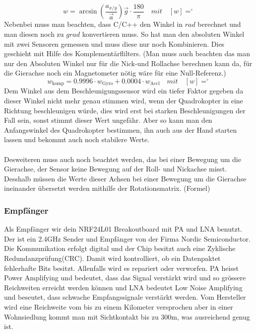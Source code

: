 \documentclass[12pt,a4paper, ngerman]{article}
\begin{document}
\begin{equation}
w=\arcsin(\frac{a_{x/y}}{\vec{a}}
)
\vec{g}\cdot \frac{180}{\pi} \quad mit \quad [w]=^\circ
\end{equation}
Nebenbei muss man beachten, dass C/C++ den Winkel in $rad$ berechnet und man diesen noch zu $grad$ konvertieren muss. So hat man den absoluten Winkel mit zwei Sensoren gemessen und muss diese nur noch Kombinieren. Dies geschieht mit Hilfe des Komplementärflilters. (Man muss auch beachten das man nur den Absoluten Winkel nur für die Nick-und Rollachse berechnen kann da, für die Gierachse noch ein Magnetometer nötig wäre für eine Null-Referenz.)
\begin{equation}
w_{\text{komp}}=0.9996\cdot w_{\text{Gyro}}+0.0004\cdot w_{\text{Accl}} \quad mit \quad [w]=^\circ
\end{equation}
Dem Winkel aus dem Beschleunigungssensor wird ein tiefer Faktor gegeben da dieser Winkel nicht mehr genau stimmen wird, wenn der Quadrokopter in eine Richtung beschleunigen würde, dies wird erst bei starken Beschleunigungen der Fall sein, sonst stimmt dieser Wert ungefähr. Aber so kann man den Anfangswinkel des Quadrokopter bestimmen, ihn auch aus der Hand starten lassen und bekommt auch noch stabilere Werte. \\ \\
Desweiteren muss auch noch beachtet werden, das bei einer Bewegung um die Gierachse, der Sensor keine Bewegung auf der Roll- und Nickachse misst. Desshalb müssen die Werte dieser Achsen bei einer Bewegung um die Gierachse ineinander übersetzt werden mithilfe der Rotationsmatrix. (Formel)

\subsubsection{Empfänger}
Als Empfänger wir dein NRF24L01 Breakoutboard mit PA und LNA benutzt. Der ist ein 2.4GHz Sender und Empfänger von der Firma Nordic Semiconductor. Die Kommunikation erfolgt digital und der Chip besitzt auch eine Zyklische Redundanzprüfung(CRC). Damit wird kontrolliert, ob ein Datenpaktet fehlerhafte Bits besitzt. Allenfalls wird es repariert oder verworfen. PA heisst Power Amplifying und bedeutet, dass das Signal verstärkt wird und so grössere Reichweiten erreicht werden können und LNA bedeutet Low Noise Amplifying und beseutet, dass schwache Empfangssignale verstärkt werden.\cite{website:electronics.stackexchange.com_WhatisPALNA} Vom Hersteller wird eine Reichweite vom bis zu einem Kilometer versprochen aber in einer Wohnsiedlung kommt man mit Sichtkontakt bis zu 300m, was ausreichend genug ist.
\end{document}
